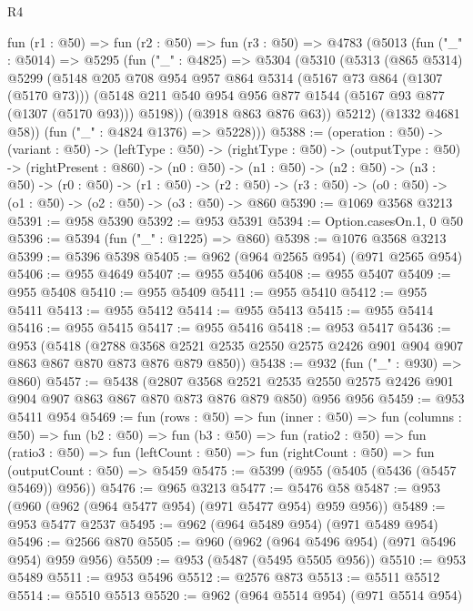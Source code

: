 \begin{lexlean}{R4}
\begin{coremodule}
  fun (r1 : @50) =>
  fun (r2 : @50) =>
  fun (r3 : @50) =>
  @4783
    (@5013
      (fun ("_" : @5014) =>
      @5295
        (fun ("_" : @4825) =>
        @5304
          (@5310
            (@5313
              (@865 @5314)
              @5299
              (@5148
                @205
                @708
                @954
                @957
                @864
                @5314
                (@5167 @73 @864 (@1307 (@5170 @73)))
                (@5148 @211 @540 @954 @956 @877 @1544 (@5167 @93 @877 (@1307 (@5170 @93))) @5198))
              (@3918 @863 @876 @63))
            @5212)
          (@1332 @4681 @58))
        (fun ("_" : @4824 @1376) => @5228)))
@5388 := (operation : @50) ->
  (variant : @50) ->
  (leftType : @50) ->
  (rightType : @50) ->
  (outputType : @50) ->
  (rightPresent : @860) ->
  (n0 : @50) ->
  (n1 : @50) ->
  (n2 : @50) ->
  (n3 : @50) ->
  (r0 : @50) ->
  (r1 : @50) ->
  (r2 : @50) -> (r3 : @50) -> (o0 : @50) -> (o1 : @50) -> (o2 : @50) -> (o3 : @50) -> @860
@5390 := @1069 @3568 @3213
@5391 := @958 @5390
@5392 := @953 @5391
@5394 := Option.casesOn.{1, 0} @50
@5396 := @5394 (fun ("_" : @1225) => @860)
@5398 := @1076 @3568 @3213
@5399 := @5396 @5398
@5405 := @962 (@964 @2565 @954) (@971 @2565 @954)
@5406 := @955 @4649
@5407 := @955 @5406
@5408 := @955 @5407
@5409 := @955 @5408
@5410 := @955 @5409
@5411 := @955 @5410
@5412 := @955 @5411
@5413 := @955 @5412
@5414 := @955 @5413
@5415 := @955 @5414
@5416 := @955 @5415
@5417 := @955 @5416
@5418 := @953 @5417
@5436 := @953
    (@5418
      (@2788 @3568 @2521 @2535 @2550 @2575 @2426 @901 @904 @907 @863 @867 @870 @873 @876 @879 @850))
@5438 := @932 (fun ("_" : @930) => @860)
@5457 := @5438
    (@2807 @3568 @2521 @2535 @2550 @2575 @2426 @901 @904 @907 @863 @867 @870 @873 @876 @879 @850)
    @956
    @956
@5459 := @953 @5411 @954
@5469 := fun (rows : @50) =>
  fun (inner : @50) =>
  fun (columns : @50) =>
  fun (b2 : @50) =>
  fun (b3 : @50) =>
  fun (ratio2 : @50) =>
  fun (ratio3 : @50) =>
  fun (leftCount : @50) => fun (rightCount : @50) => fun (outputCount : @50) => @5459
@5475 := @5399 (@955 (@5405 (@5436 (@5457 @5469)) @956))
@5476 := @965 @3213
@5477 := @5476 @58
@5487 := @953 (@960 (@962 (@964 @5477 @954) (@971 @5477 @954) @959 @956))
@5489 := @953 @5477 @2537
@5495 := @962 (@964 @5489 @954) (@971 @5489 @954)
@5496 := @2566 @870
@5505 := @960 (@962 (@964 @5496 @954) (@971 @5496 @954) @959 @956)
@5509 := @953 (@5487 (@5495 @5505 @956))
@5510 := @953 @5489
@5511 := @953 @5496
@5512 := @2576 @873
@5513 := @5511 @5512
@5514 := @5510 @5513
@5520 := @962 (@964 @5514 @954) (@971 @5514 @954)

\end{coremodule}
\end{lexlean}
